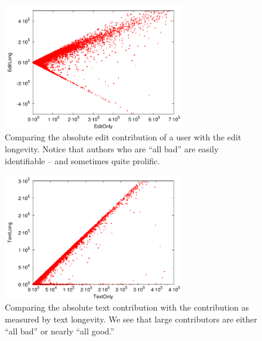 \begin{figure}[tbhp]
    \begin{center}
    \includegraphics[width=0.70\textwidth]{part-I10-contrib/graphs/score-zoom-editonly-editlong}
    \end{center}
    \caption[EditOnly vs EditLong]{
    	Comparing the absolute edit contribution of a user
	with the edit longevity.
	Notice that authors who are ``all bad''
	are easily identifiable -- and sometimes quite prolific.
    }
    \label{fig-zoom-editonly-editlong}
\end{figure}
%
\begin{figure}[tbhp]
    \begin{center}
    \includegraphics[width=0.70\textwidth]{part-I10-contrib/graphs/score-zoom-textonly-textlong}
    \end{center}
    \caption[TextOnly vs TextLong]{
    	Comparing the absolute text contribution with the contribution
	as measured by text longevity.
	We see that large contributors are either ``all bad''
	or nearly ``all good.''
    }
    \label{fig-zoom-textonly-textlong}
\end{figure}
%
